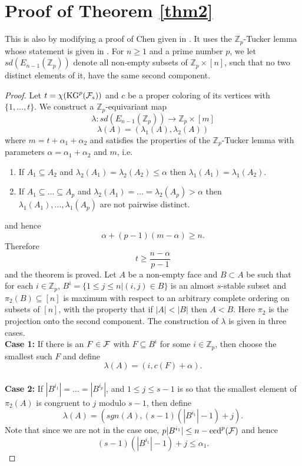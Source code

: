 \documentclass[a4paper,11pt]{article}
\begin{document}
\section{Proof of Theorem \ref{thm2}}

This is also by modifying  a proof of Chen given in \cite{C2}. It uses the $\mathbb Z_p$-Tucker lemma whose statement is given in \cite{M}. For $n\ge 1$ and a prime number $p$, we let 
$sd(E_{n-1}(\mathbb Z_p))$ denote all non-empty subsets of $\mathbb Z_p\times [n]$, such that no two distinct elements of it, have the same second component.

\begin{proof}
Let $t=\chi(\mbox{KG}^p({\cal F}_s))$ and $c$ be a proper coloring of its vertices with $\{1,\dots, t\}$.
 We construct a $\mathbb Z_p$-equivariant map 
$$\lambda: sd(E_{n-1}(\mathbb Z_p))\longrightarrow \mathbb Z_p\times [m]$$
$$\lambda(A)=(\lambda_1(A),\lambda_2(A))$$
where $m=t+\alpha_1+\alpha_2$ and satisfies the properties of the $\mathbb Z_p$-Tucker lemma with parameters $\alpha=\alpha_1+\alpha_2$ and $m$, i.e.
\begin{enumerate}
\item If $A_1\subseteq A_2$ and $\lambda_2(A_1)=\lambda_2(A_2)\le \alpha$ then $\lambda_1(A_1)=\lambda_1(A_2)$.
\item If $A_1\subseteq \dots \subseteq A_p$ and $\lambda_2(A_1)=\dots=\lambda_2(A_p)>\alpha$ then $\lambda_1(A_1),\dots, \lambda_1(A_p)$ are not pairwise distinct.
\end{enumerate}
 and hence
$$\alpha+(p-1)(m-\alpha)\ge n.$$
Therefore
$$t\ge \frac{n-\alpha}{p-1}$$
and the theorem is proved. Let $A$ be a non-empty face and $B\subset A$ be such that for each $i\in \mathbb Z_p$, $B^i=\{1\le j\le n| (i,j)\in B\}$ is an almost $s$-stable subset and $\pi_2(B)\subseteq [n]$ is maximum with respect to an arbitrary complete ordering on subsets of $[n]$, with the property that if $|A|<|B|$ then $A<B$. Here $\pi_2$ is the projection onto the second component.  The construction of $\lambda$ is given in three cases. 
\\
{\textbf{Case 1:}}  If there is an $F\in{\cal F}$ with $F\subseteq B^i$ for some $i\in {\mathbb Z}_p$, then choose the smallest such $F$ and define
$$\lambda(A)=(i, c(F)+\alpha).$$
\\
{\textbf{Case 2:}} If $|B^{i_1}|=\dots=|B^{i_p}|$, and $1\le j\le s-1$ is so that the smallest element of $\pi_2(A)$ is congruent to $j$ modulo $s-1$, then define
$$\lambda(A)=(sgn(A), (s-1)(|B^{i_1}|-1)+j).$$
Note that since we are not in the case one,  $p|B^{i_1}|\le n-\mbox{ecd}^p({\cal F})$ and hence $$(s-1)(|B^{i_1}|-1)+j\le \alpha_1.$$

\end{proof}
\end{document}
